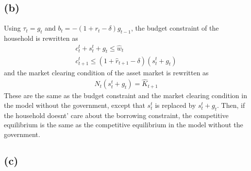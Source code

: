 \documentclass{ltjsarticle}
\begin{document}
\subsection*{(b)}

Using $\tau_t = g_t$ and $b_t = -(1 + r_t - \delta) g_{t-1}$, the budget constraint of the household is rewritten as
\begin{gather*}
  c_t^t + s_t^t + g_t \leq \hat{w}_t\\
  c_{t+1}^t \leq (1 + \hat{r}_{t+1} - \delta) (s_t^t +  g_t)
\end{gather*}
and the market clearing condition of the asset market is rewritten as
\begin{gather*}
  N_t (s_t^t + g_t )= \hat{K}_{t+1}
\end{gather*}
These are the same as the budget constraint and the market clearing condition in the model without the government, except that $s_t^t$ is replaced by $s_t^t + g_t$. Then, if the household doesnt' care about the borrowing constraint, the competitive equilibrium is the same as the competitive equilibrium in the model without the government.

\subsection*{(c)}
\end{document}
